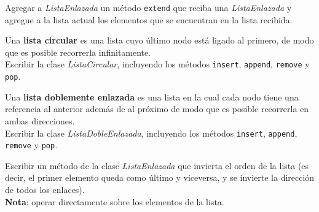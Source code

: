 \begin{ejercicio}
Agregar a \emph{ListaEnlazada} un método \verb!extend! que reciba una
\emph{ListaEnlazada} y agregue a la lista actual los elementos que se encuentran
en la lista recibida.
\end{ejercicio}

\begin{ejercicio}
Una {\bf lista circular} es una lista cuyo último nodo está ligado al primero,
de modo que es posible recorrerla infinitamente.  \\
Escribir la clase \emph{ListaCircular}, incluyendo los métodos \verb!insert!,
\verb!append!, \verb!remove! y \verb!pop!.
\end{ejercicio}

\begin{ejercicio}
Una {\bf lista doblemente enlazada} es una lista en la cual cada nodo tiene
una referencia al anterior además de al próximo de modo que es posible
recorrerla en ambas direcciones. \\
Escribir la clase \emph{ListaDobleEnlazada}, incluyendo los métodos
\verb!insert!, \verb!append!, \verb!remove! y \verb!pop!.
\end{ejercicio}

\begin{ejercicio}
Escribir un método de la clase \emph{ListaEnlazada} que invierta el orden
de la lista (es decir, el primer elemento queda como último y
viceversa, y se invierte la dirección de todos los enlaces). \\
{\bf Nota}: operar directamente sobre los elementos de la lista.
\end{ejercicio}

